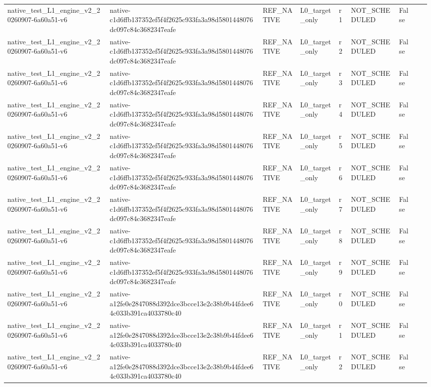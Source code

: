 \begin{tabular}{lllllllll}
native\_test\_L1\_engine\_v2\_20260907-6a60a51-v6 & native-c1d6ffb137352ef5f4f2625c933fa3a98d5801448076dc097c84c3682347eafe & REF\_NATIVE & L0\_target\_only & r1 & NOT\_SCHEDULED & False &  &  \\
native\_test\_L1\_engine\_v2\_20260907-6a60a51-v6 & native-c1d6ffb137352ef5f4f2625c933fa3a98d5801448076dc097c84c3682347eafe & REF\_NATIVE & L0\_target\_only & r2 & NOT\_SCHEDULED & False &  &  \\
native\_test\_L1\_engine\_v2\_20260907-6a60a51-v6 & native-c1d6ffb137352ef5f4f2625c933fa3a98d5801448076dc097c84c3682347eafe & REF\_NATIVE & L0\_target\_only & r3 & NOT\_SCHEDULED & False &  &  \\
native\_test\_L1\_engine\_v2\_20260907-6a60a51-v6 & native-c1d6ffb137352ef5f4f2625c933fa3a98d5801448076dc097c84c3682347eafe & REF\_NATIVE & L0\_target\_only & r4 & NOT\_SCHEDULED & False &  &  \\
native\_test\_L1\_engine\_v2\_20260907-6a60a51-v6 & native-c1d6ffb137352ef5f4f2625c933fa3a98d5801448076dc097c84c3682347eafe & REF\_NATIVE & L0\_target\_only & r5 & NOT\_SCHEDULED & False &  &  \\
native\_test\_L1\_engine\_v2\_20260907-6a60a51-v6 & native-c1d6ffb137352ef5f4f2625c933fa3a98d5801448076dc097c84c3682347eafe & REF\_NATIVE & L0\_target\_only & r6 & NOT\_SCHEDULED & False &  &  \\
native\_test\_L1\_engine\_v2\_20260907-6a60a51-v6 & native-c1d6ffb137352ef5f4f2625c933fa3a98d5801448076dc097c84c3682347eafe & REF\_NATIVE & L0\_target\_only & r7 & NOT\_SCHEDULED & False &  &  \\
native\_test\_L1\_engine\_v2\_20260907-6a60a51-v6 & native-c1d6ffb137352ef5f4f2625c933fa3a98d5801448076dc097c84c3682347eafe & REF\_NATIVE & L0\_target\_only & r8 & NOT\_SCHEDULED & False &  &  \\
native\_test\_L1\_engine\_v2\_20260907-6a60a51-v6 & native-c1d6ffb137352ef5f4f2625c933fa3a98d5801448076dc097c84c3682347eafe & REF\_NATIVE & L0\_target\_only & r9 & NOT\_SCHEDULED & False &  &  \\
native\_test\_L1\_engine\_v2\_20260907-6a60a51-v6 & native-a12fe0e2847088d392dce3bcce13e2c38b9b44fdee64c033b391ca4033780c40 & REF\_NATIVE & L0\_target\_only & r0 & NOT\_SCHEDULED & False &  &  \\
native\_test\_L1\_engine\_v2\_20260907-6a60a51-v6 & native-a12fe0e2847088d392dce3bcce13e2c38b9b44fdee64c033b391ca4033780c40 & REF\_NATIVE & L0\_target\_only & r1 & NOT\_SCHEDULED & False &  &  \\
native\_test\_L1\_engine\_v2\_20260907-6a60a51-v6 & native-a12fe0e2847088d392dce3bcce13e2c38b9b44fdee64c033b391ca4033780c40 & REF\_NATIVE & L0\_target\_only & r2 & NOT\_SCHEDULED & False &  &  \\

\end{tabular}
